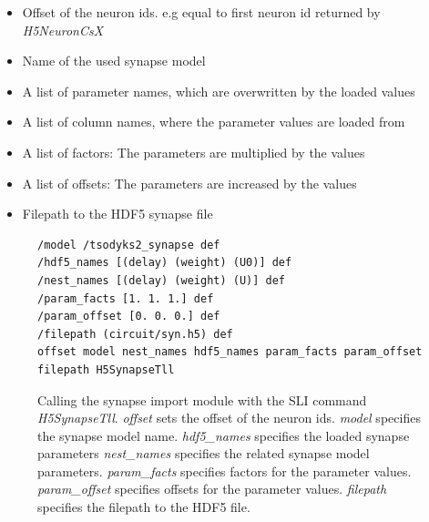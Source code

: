 \begin{itemize}
      \item Offset of the neuron ids. e.g equal to first neuron id returned by \emph{H5NeuronCsX}
      \item Name of the used synapse model
      \item A list of parameter names, which are overwritten by the loaded values
      \item A list of column names, where the parameter values are loaded from
      \item A list of factors: The parameters are multiplied by the values
      \item A list of offsets: The parameters are increased by the values
      \item Filepath to the HDF5 synapse file
\end{itemize}
\begin{figure}[ht!]
\begin{lstlisting}[]
/model /tsodyks2_synapse def
/hdf5_names [(delay) (weight) (U0)] def
/nest_names [(delay) (weight) (U)] def
/param_facts [1. 1. 1.] def
/param_offset [0. 0. 0.] def
/filepath (circuit/syn.h5) def
offset model nest_names hdf5_names param_facts param_offset filepath H5SynapseTll
\end{lstlisting}
\caption[Calling the synapse import module with the SLI command \emph{H5SynapseTll}]{Calling the synapse import module with the
SLI command \emph{H5SynapseTll}.
\emph{offset} sets the offset of the neuron ids.
\emph{model} specifies the synapse model name.
\emph{hdf5\_names} specifies the loaded synapse parameters
\emph{nest\_names} specifies the related synapse model parameters.
\emph{param\_facts} specifies factors for the parameter values.
\emph{param\_offset} specifies offsets for the parameter values.
\emph{filepath} specifies the filepath to the HDF5 file.}
\end{figure}

